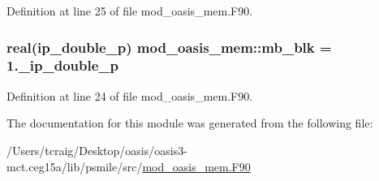 Definition at line 25 of file mod\+\_\+oasis\+\_\+mem.\+F90.

\hypertarget{classmod__oasis__mem_a7c262f1c120ed57d527ee3de91552ee9}{
\subsubsection[{mb\+\_\+blk}]{\setlength{\rightskip}{0pt plus 5cm}real(ip\+\_\+double\+\_\+p) mod\+\_\+oasis\+\_\+mem\+::mb\+\_\+blk = 1.\+\_\+ip\+\_\+double\+\_\+p\hspace{0.3cm}{\ttfamily [private]}}}\label{classmod__oasis__mem_a7c262f1c120ed57d527ee3de91552ee9}


Definition at line 24 of file mod\+\_\+oasis\+\_\+mem.\+F90.



The documentation for this module was generated from the following file\+:\begin{DoxyCompactItemize}
\item 
/\+Users/tcraig/\+Desktop/oasis/oasis3-\/mct.\+ceg15a/lib/psmile/src/\hyperlink{mod__oasis__mem_8_f90}{mod\+\_\+oasis\+\_\+mem.\+F90}\end{DoxyCompactItemize}
